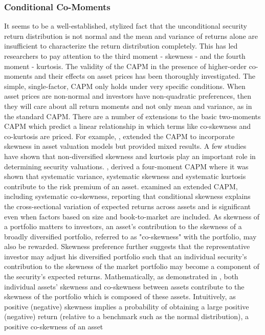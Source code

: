 \subsubsection{Conditional Co-Moments}\label{II}
It seems to be a well-established, stylized fact that the unconditional security
return distribution is not normal and the mean and variance of returns alone are
insufficient to characterize the return distribution completely. This has led
researchers to pay attention to the third moment - skewness - and the  fourth
moment - kurtosis. The validity of the CAPM in the presence of higher-order
co-moments and their effects on asset prices has been thoroughly investigated.
The simple, single-factor, CAPM only holds under very specific conditions.
When asset prices are non-normal and investors have non-quadratic preferences,
then they will care about all return moments and not only mean and variance,
as in the standard CAPM.
There are a number of extensions to the basic two-moments CAPM which predict a
linear relationship in which terms like co-skewness and co-kurtosis are priced.
For example, \cite{Kraus1976}, \cite{Sears1985} extended the CAPM to
incorporate skewness in asset valuation models but provided mixed results. A few
studies have shown that non-diversified skewness and kurtosis play an important
role in determining security valuations. \cite{Fang1997}, derived a four-moment
CAPM where it was shown that systematic variance, systematic skewness and systematic
kurtosis contribute to the risk premium of an asset. \cite{Harvey2000}
examined an extended CAPM, including systematic co-skewness,  reporting that
conditional skewness explains the cross-sectional variation of expected returns
across assets and is significant even when factors based on size and book-to-market
are included. As skewness of a portfolio matters to investors, an asset's contribution
to the skewness of a broadly diversified portfolio, referred to as "co-skewness"
with the portfolio, may also be rewarded. Skewness preference further suggests that
the representative investor may adjust his diversified portfolio such that an individual
security's contribution to the skewness of the market portfolio may become a component
of the security's expected returns.
Mathematically, as demonstrated in \cite{Conine1981}, both individual assets'
skewness  and co-skewness between assets contribute to the skewness of the portfolio
which is composed of these assets. Intuitively, as positive (negative) skewness
implies a probability of obtaining a large positive (negative) return (relative
to a benchmark such as the normal distribution), a positive co-skewness of an asset
